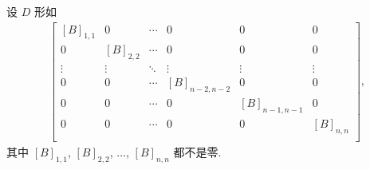 设 \(D\) 形如
\begin{align*}
    \begin{bmatrix}
        [B]_{1,1} & 0         & \cdots & 0             & 0             & 0         \\
        0         & [B]_{2,2} & \cdots & 0             & 0             & 0         \\
        \vdots    & \vdots    & \ddots & \vdots        & \vdots        & \vdots    \\
        0         & 0         & \cdots & [B]_{n-2,n-2} & 0             & 0         \\
        0         & 0         & \cdots & 0             & [B]_{n-1,n-1} & 0         \\
        0         & 0         & \cdots & 0             & 0             & [B]_{n,n} \\
    \end{bmatrix},
\end{align*}
其中 \([B]_{1,1}\), \([B]_{2,2}\), \(\dots\), \([B]_{n,n}\)
都不是零.

